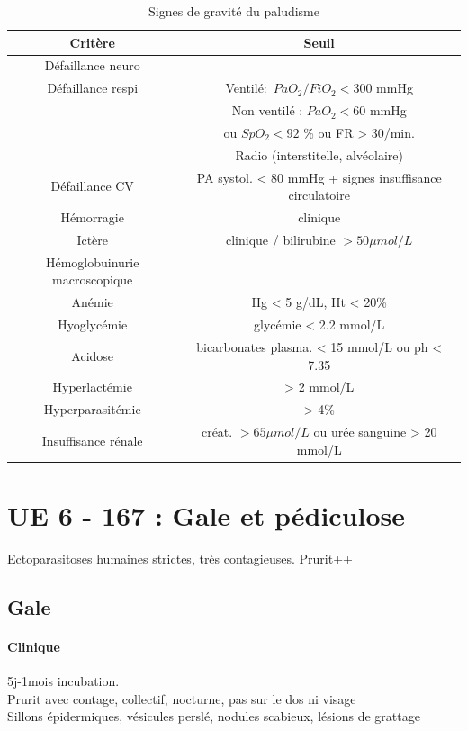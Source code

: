 \documentclass{article}
\begin{document}
\begin{table}[htpb]
  \centering
  \caption{Signes de gravité du paludisme}
  \begin{tabular}{cc}
    \toprule
    Critère& Seuil\\
    \midrule
    Défaillance neuro& \\
    Défaillance respi& Ventilé:~\(PaO_2/FiO_2 < 300\) mmHg\\
    & Non ventilé : \(PaO_2 < 60\) mmHg\\
    & ou \(SpO_2 < 92\) \% ou FR > 30/min. \\
    &Radio (interstitelle, alvéolaire)\\
    Défaillance CV& PA systol. < 80 mmHg + signes insuffisance circulatoire\\
    Hémorragie& clinique\\
    Ictère& clinique / bilirubine \(> 50 \mu{}mol/L\)\\
    Hémoglobuinurie macroscopique& \\
    Anémie& Hg < 5 g/dL, Ht < 20\%\\
    Hyoglycémie& glycémie < 2.2 mmol/L\\
    Acidose& bicarbonates plasma. < 15 mmol/L ou ph < 7.35\\
    Hyperlactémie& > 2 mmol/L\\
    Hyperparasitémie& > 4\%\\
    Insuffisance rénale& créat. \(> 65 \mu{}mol/L\) ou urée sanguine > 20 mmol/L\\
    \bottomrule
  \end{tabular}
\end{table}

\section{UE 6 - 167 : Gale et pédiculose}

Ectoparasitoses humaines strictes, très contagieuses. Prurit++

\subsection{Gale}
\paragraph{Clinique} 5j-1mois incubation.\\
Prurit avec contage, collectif, nocturne, pas sur le dos ni visage\\
Sillons épidermiques, vésicules perslé, nodules scabieux, lésions de grattage
\end{document}
